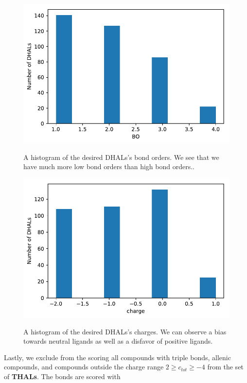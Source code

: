 \begin{figure}[ht] 
	\begin{minipage}[b]{0.5\linewidth}
		\centering
		\includegraphics[width=.9\linewidth]{img/dhal_ss_hist_bo.pdf} 
		\caption{A histogram of the desired DHALs's bond orders. We see that we have much more low bond orders than high bond orders..} 
		\label{fig:dhalhist_bo}
		\vspace{4ex}
	\end{minipage}%
	\begin{minipage}[b]{0.5\linewidth}
		\centering
		\includegraphics[width=.9\linewidth]{img/dhal_ss_hist_charge.pdf} 
		\caption{A histogram of the desired DHALs's charges. We can observe a bias towards neutral ligands as well as a disfavor of positive ligands.} 
		\vspace{4ex}
		\label{fig:dhalhist_charge}
	\end{minipage}
\end{figure}

Lastly, we exclude from the scoring all compounds with triple bonds, allenic compounds, and compounds outside the charge range $2 \geq c_{tot} \geq -4$ from the set of \textbf{THALs}.
The bonds are scored with 

